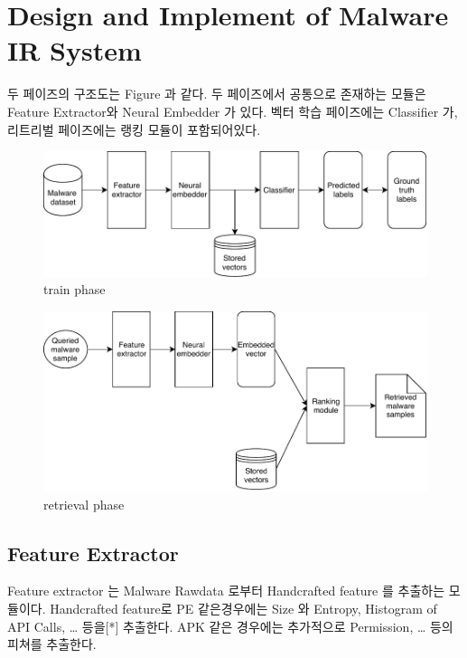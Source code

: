 

\section{Design and Implement of Malware IR System}

두 페이즈의 구조도는 Figure 과 같다. 두 페이즈에서 공통으로 존재하는 모듈은 Feature Extractor와 Neural Embedder 가 있다. 벡터 학습 페이즈에는 Classifier 가, 리트리벌 페이즈에는 랭킹 모듈이 포함되어있다. 
\begin{figure}
  \includegraphics[width=\linewidth]{../figures/train_phase.pdf}
  \caption{train phase}
  \label{fig:one}
\end{figure}
\begin{figure}
  \includegraphics[width=\linewidth]{../figures/retrieval_phase.pdf}
  \caption{retrieval phase}
  \label{fig:two}
\end{figure}


\subsection{Feature Extractor}

Feature extractor 는 Malware Rawdata 로부터 Handcrafted feature 를 추출하는 모듈이다. Handcrafted feature로 PE 같은경우에는 Size 와 Entropy, Histogram of API Calls, … 등을[*] 추출한다. APK 같은 경우에는 추가적으로 Permission,  … 등의 피쳐를 추출한다. 


